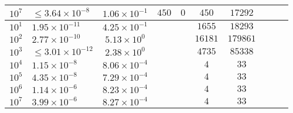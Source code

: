 \begin{tabular}{l l c c c c c c c c}
    $10^7$  &  $\leq 3.64 \times 10^{-8}$  &  $1.06 \times 10^{-1}$    &  $450$  &  $0$  &  $450$  &  $17292$  & & & \\ 
\hline \hline
$10^1$  &  $1.95 \times 10^{-11}$  &  $4.25 \times 10^{-1}$  &  &  & $1655$ & $18293$ & & & \\ 
$10^2$  &  $2.77 \times 10^{-10}$  &  $5.13 \times 10^{0}$  &  &  & $16181$ & $179861$ & & & \\ 
$10^3$  &  $\leq 3.01 \times 10^{-12}$  &  $2.38 \times 10^{0}$  &  &  & $4735$ & $85338$ & & & \\ 
$10^4$  &  $1.15 \times 10^{-8}$  &  $8.06 \times 10^{-4}$  &  &  & $4$ & $33$ & & & \\ 
$10^5$  &  $4.35 \times 10^{-8}$  &  $7.29 \times 10^{-4}$  &  &  & $4$ & $33$ & & & \\ 
$10^6$  &  $1.14 \times 10^{-6}$  &  $8.23 \times 10^{-4}$  &  &  & $4$ & $33$ & & & \\ 
$10^7$  &  $3.99 \times 10^{-6}$  &  $8.27 \times 10^{-4}$  &  &  & $4$ & $33$ & & & \\ 
\end{tabular}
